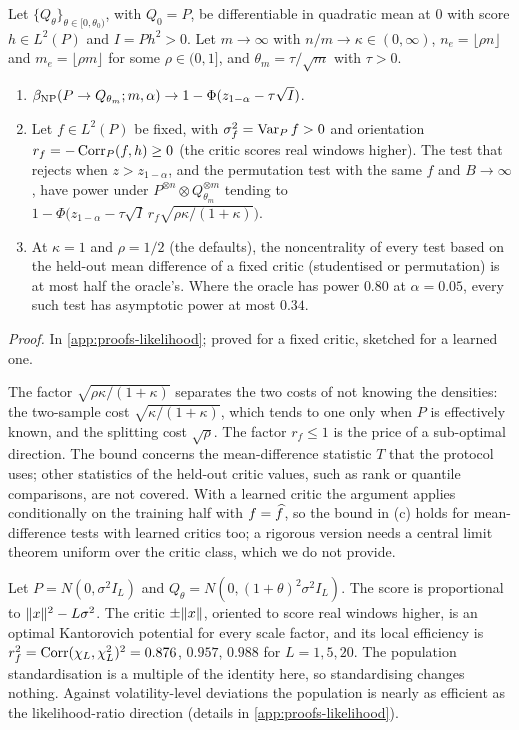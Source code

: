 \begin{proposition}\label{prop:local-power}
Let $\{Q_\theta\}_{\theta\in[0,\theta_0)}$, with $Q_0=P$, be differentiable in quadratic mean at
$0$ with score $h\in L^2(P)$ and $I=Ph^2>0$. Let $m\to\infty$ with $n/m\to\kappa\in(0,\infty)$,
$n_e=\lfloor\rho n\rfloor$ and $m_e=\lfloor\rho m\rfloor$ for some $\rho\in(0,1]$, and
$\theta_m=\tau/\sqrt m$ with $\tau>0$.
\begin{enumerate}
  \item[(a)] $\beta_{\mathrm{NP}}(P\to Q_{\theta_m};m,\alpha)\to1-\Phi(z_{1-\alpha}-\tau\sqrt I)$.
  \item[(b)] Let $f\in L^2(P)$ be fixed, with $\sigma_f^2=\operatorname{Var}_Pf>0$ and orientation
  $r_f=-\operatorname{Corr}_P(f,h)\ge0$ (the critic scores real windows higher). The test that rejects when
  $z>z_{1-\alpha}$, and the permutation test with the same $f$ and $B\to\infty$, have power
  under
  $P^{\otimes n}\otimes Q_{\theta_m}^{\otimes m}$ tending to
  $1-\Phi\big(z_{1-\alpha}-\tau\sqrt I\,r_f\sqrt{\rho\kappa/(1+\kappa)}\big)$.
  \item[(c)] At $\kappa=1$ and $\rho=1/2$ (the defaults), the noncentrality of every test based on
  the held-out mean difference of a fixed critic (studentised or permutation) is at most half the
  oracle's. Where the oracle has power $0.80$ at $\alpha=0.05$, every such test has asymptotic
  power at most $0.34$.
\end{enumerate}
\end{proposition}
\noindent\textit{Proof.} In \cref{app:proofs-likelihood}; proved for a fixed critic, sketched for
a learned one.

The factor $\sqrt{\rho\kappa/(1+\kappa)}$ separates the two costs of not knowing the densities:
the two-sample cost $\sqrt{\kappa/(1+\kappa)}$, which tends to one only when $P$ is effectively
known, and the splitting cost $\sqrt\rho$. The factor $r_f\le1$ is the price of a sub-optimal
direction. The bound concerns the mean-difference statistic $T$ that the protocol uses; other
statistics of the held-out critic values, such as rank or quantile comparisons, are not covered.
With a learned critic the argument applies conditionally on the training half with $f=\widehat{f}$, so
the bound in (c) holds for mean-difference tests with learned critics too; a rigorous version
needs a central limit theorem uniform over the critic class, which we do not provide.

\begin{example}\label{ex:vol-level}
Let $P=N(0,\sigma^2I_L)$ and $Q_\theta=N(0,(1+\theta)^2\sigma^2I_L)$. The score is proportional to
$\lVert x\rVert^2-L\sigma^2$. The critic $\pm\lVert x\rVert$, oriented to score real windows higher, is an
optimal Kantorovich potential for every scale factor, and its local efficiency is
$r_f^2=\operatorname{Corr}(\chi_L,\chi_L^2)^2=0.876$, $0.957$, $0.988$ for $L=1,5,20$. The population
standardisation is a multiple of the identity here, so standardising changes nothing. Against
volatility-level deviations the population \WC{} is nearly as efficient as the likelihood-ratio
direction (details in \cref{app:proofs-likelihood}).
\end{example}

